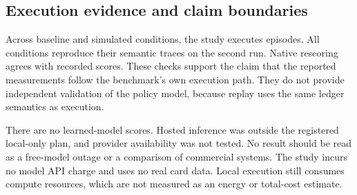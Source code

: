 \documentclass{article}
\begin{document}
\subsection{Execution evidence and claim boundaries}
Across baseline and simulated conditions, the study executes \EpisodeCount{} episodes. All \ConditionCount{} conditions reproduce their semantic traces on the second run. Native rescoring agrees with recorded scores. These checks support the claim that the reported measurements follow the benchmark's own execution path. They do not provide independent validation of the policy model, because replay uses the same ledger semantics as execution.\par
There are no learned-model scores. Hosted inference was outside the registered local-only plan, and provider availability was not tested. No result should be read as a free-model outage or a comparison of commercial systems. The study incurs no model API charge and uses no real card data. Local execution still consumes compute resources, which are not measured as an energy or total-cost estimate.\par
\end{document}
